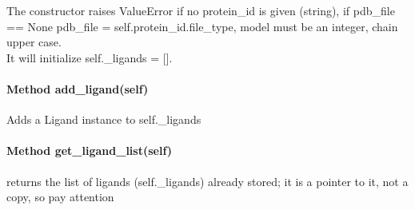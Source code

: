             $\ $\\The constructor raises ValueError if no protein\_id is given (string), if pdb\_file == None pdb\_file = {self.protein\_id}.{file\_type}, model must be an integer, chain upper case.\\
            It will initialize self.\_ligands = [].

        \paragraph{Method add\_ligand(self)}

            Adds a Ligand instance to self.\_ligands

        \paragraph{Method get\_ligand\_list(self)}
            
            returns the list of ligands (self.\_ligands) already stored; it is a pointer to it, not a copy, so pay attention

